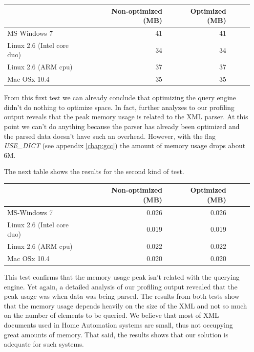 \documentclass[a4paper]{report}
\begin{document}
	\begin{center}
  			\begin{tabular}{ | l | r | r | r | r | r | }
			    \hline
				       	       		     			 & Non-optimized (MB) & Optimized (MB)\\ \hline
				    MS-Windows 7   			&  41  & 41  \\ \hline
				    Linux 2.6 (Intel core duo) 	&  34  & 34  \\ \hline
				    Linux 2.6 (ARM cpu)   		&  37  & 37 \\ \hline
				    Mac OSx 10.4   			&  35  & 35 \\
			    \hline
			\end{tabular}
	\end{center}

	From this first test we can already conclude that optimizing the query engine didn't do nothing to optimize space. In fact, further analyzes to our profiling output reveals that the peak memory usage is related to the XML parser. At this point we can't do anything because the parser has already been optimized and the parsed data doesn't have such an overhead. However, with the flag \emph{USE\_DICT} (see appendix \ref{chap:gcc}) the	amount of memory usage drops about 6M.

	The next table shows the results for the second kind of test.

	\begin{center}
  			\begin{tabular}{ | l | r | r | r | r | r | }
			    \hline
				       	       		     			 & Non-optimized (MB) & Optimized (MB)\\ \hline
				    MS-Windows 7   			&  0.026  & 0.026  \\ \hline
				    Linux 2.6 (Intel core duo) 	&  0.019  & 0.019  \\ \hline
				    Linux 2.6 (ARM cpu)   		&  0.022  & 0.022 \\ \hline
				    Mac OSx 10.4   			&  0.020  & 0.020 \\
			    \hline
			\end{tabular}
	\end{center}

	This test confirms that the memory usage peak isn't related with the querying engine. Yet again, a detailed analysis of our profiling output revealed that the peak usage was when data was being parsed. The results from both tests show that the memory usage depends heavily on the size of the XML and not so much on the number of elements to be queried. We believe that most of XML documents used in Home Automation systems are small, thus not occupying great amounts of memory. That said, the results shows that our solution is adequate for such systems.
\end{document}
